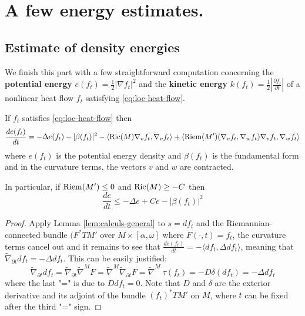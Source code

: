 \section{A few energy estimates.}
\label{sec:org1ad5b6a}
\subsection{Estimate of density energies}
\label{sec:org30239a7}
We finish this part with a few straightforward computation concerning the \textbf{potential
energy} \(e(f_t) = \frac{1}{2}|\nabla f_t|^2\) and the \textbf{kinetic energy} \(k(f_t) =
\frac{1}{2}|\frac{\partial f_t}{\partial t}|\) of a nonlinear heat flow \(f_t\)
satisfying \eqref{eq:loc-heat-flow}.

\begin{theorem}
\label{thm:den-pot}
If \(f_t\) satisfies \eqref{eq:loc-heat-flow} then 
\[
 \frac{d e(f_t)}{dt}= -\Delta e(f_t) - |\beta(f_t)|^2 - \left\langle \mathop{\rm Ric}\nolimits(M) \nabla_v
f_t,\nabla_v f_t \rangle + \langle \mathop{\rm Riem}\nolimits(M') (\nabla_v f_t,\nabla_w f_t)\nabla_v
f_t,\nabla_w f_t \right\rangle
\]
where \(e(f_t)\) is the potential energy density and \(\beta(f_t)\) is the fundamental
form and in the curvature terms, the vectors \(v\) and \(w\) are contracted.

In particular, if  \(\mathop{\rm Riem}\nolimits(M') \leq 0\) and \(\mathop{\rm Ric}\nolimits(M)\geq -C\) then
\begin{equation}
\label{eq:den-pot-est}
\frac{d e}{dt} \leq -\Delta e + Ce - |\beta(f_t)|^2
\end{equation}
\end{theorem}
\begin{proof}
Apply Lemma \ref{lem:calculs-general} to \(s = d f_t\) and the Riemannian-connected
bundle \((F^* TM'\) over \(M\times [\alpha,\omega]\) where \(F(\cdot,t) = f_t\), the curvature terms cancel
out and it remains to see that
\(\frac{d e(f_t)}{dt}= - \langle df_t, \Delta df_t \rangle\), meaning that \(\tilde \nabla_{\partial t} df_t = -\Delta df_t\). This can be easily
justified:
\[
\tilde \nabla_{\partial t} df_t = \tilde \nabla_{\partial t} \tilde\nabla^M F=  \tilde\nabla^M
\tilde\nabla_{\partial t} F= \tilde\nabla^M\ \tau (f_t) = -D\delta (df_t) = -\Delta df_t
\]
where the last "=" is due to \(D df_t = 0\). Note that \(D\) and \(\delta\)
are the exterior derivative and its adjoint of the bundle \((f_t)^*TM'\) on \(M\),
where \(t\) can be fixed after the third "=" sign.
\end{proof}

